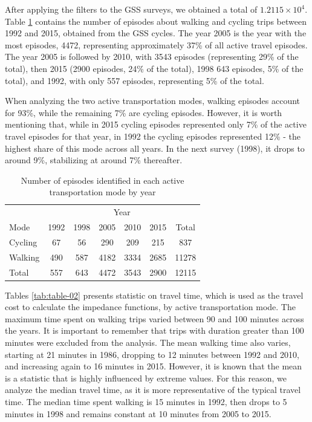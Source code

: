 \documentclass[preprint, 3p,
authoryear]{elsarticle} %
\begin{document}
After applying the filters to the GSS surveys, we obtained a total of
\ensuremath{1.2115\times 10^{4}}. Table \ref{tab:table-01} contains the
number of episodes about walking and cycling trips between 1992 and
2015, obtained from the GSS cycles. The year 2005 is the year with the
most episodes, 4472, representing approximately 37\% of all active
travel episodes. The year 2005 is followed by 2010, with 3543 episodes
(representing 29\% of the total), then 2015 (2900 episodes, 24\% of the
total), 1998 643 episodes, 5\% of the total), and 1992, with only 557
episodes, representing 5\% of the total.

When analyzing the two active transportation modes, walking episodes
account for 93\%, while the remaining 7\% are cycling episodes. However,
it is worth mentioning that, while in 2015 cycling episodes represented
only 7\% of the active travel episodes for that year, in 1992 the
cycling episodes represented 12\% - the highest share of this mode
across all years. In the next survey (1998), it drops to around 9\%,
stabilizing at around 7\% thereafter.

\begingroup\fontsize{10}{12}\selectfont

\begin{longtable}[t]{lcccccc}
\caption{\label{tab:bulding table-01}\label{tab:table-01}Number of episodes identified in each active transportation mode by year}\\
\toprule
\multicolumn{1}{c}{ } & \multicolumn{6}{c}{Year} \\
\cmidrule(l{3pt}r{3pt}){2-7}
Mode & 1992 & 1998 & 2005 & 2010 & 2015 & Total\\
\midrule
Cycling & 67 & 56 & 290 & 209 & 215 & 837\\
Walking & 490 & 587 & 4182 & 3334 & 2685 & 11278\\
Total & 557 & 643 & 4472 & 3543 & 2900 & 12115\\
\bottomrule
\end{longtable}
\endgroup{}

Tables \ref{tab:table-02} presents statistic on travel time, which is
used as the travel cost to calculate the impedance functions, by active
transportation mode. The maximum time spent on walking trips varied
between 90 and 100 minutes across the years. It is important to remember
that trips with duration greater than 100 minutes were excluded from the
analysis. The mean walking time also varies, starting at 21 minutes in
1986, dropping to 12 minutes between 1992 and 2010, and increasing again
to 16 minutes in 2015. However, it is known that the mean is a statistic
that is highly influenced by extreme values. For this reason, we analyze
the median travel time, as it is more representative of the typical
travel time. The median time spent walking is 15 minutes in 1992, then
drops to 5 minutes in 1998 and remains constant at 10 minutes from 2005
to 2015.
\end{document}
